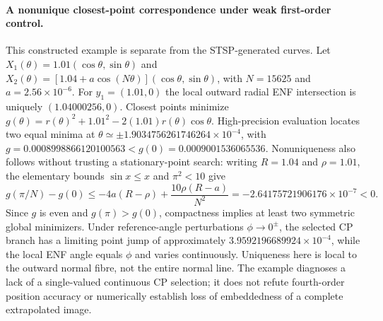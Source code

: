 \paragraph{A nonunique closest-point correspondence under weak first-order control.}
This constructed example is separate from the STSP-generated curves. Let $X_1(\theta)=1.01(\cos\theta,\sin\theta)$ and $X_2(\theta)=[1.04+a\cos(N\theta)](\cos\theta,\sin\theta)$, with $N=15625$ and $a=2.56\times10^{-6}$. For $y_1=(1.01,0)$ the local outward radial ENF intersection is uniquely $(1.04000256,0)$. Closest points minimize $g(\theta)=r(\theta)^2+1.01^2-2(1.01)r(\theta)\cos\theta$. High-precision evaluation locates two equal minima at $\theta\simeq\pm1.9034756261746264\times10^{-4}$, with $g=0.0008998866120100563<g(0)=0.0009001536065536$. Nonuniqueness also follows without trusting a stationary-point search: writing $R=1.04$ and $\rho=1.01$, the elementary bounds $\sin x\le x$ and $\pi^2<10$ give
\[
g(\pi/N)-g(0)\le -4a(R-\rho)+\frac{10\rho(R-a)}{N^2}
=-2.64175721906176\times10^{-7}<0.
\]
Since $g$ is even and $g(\pi)>g(0)$, compactness implies at least two symmetric global minimizers. Under reference-angle perturbations $\phi\to0^\pm$, the selected CP branch has a limiting point jump of approximately $3.9592196689924\times10^{-4}$, while the local ENF angle equals $\phi$ and varies continuously. Uniqueness here is local to the outward normal fibre, not the entire normal line. The example diagnoses a lack of a single-valued continuous CP selection; it does not refute fourth-order position accuracy or numerically establish loss of embeddedness of a complete extrapolated image.
